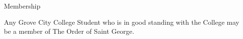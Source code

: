 {
	\begin{article}{Membership}
		\item Any Grove City College Student who is in good standing with the College may be a member of The Order of Saint George.
	\end{article}
}